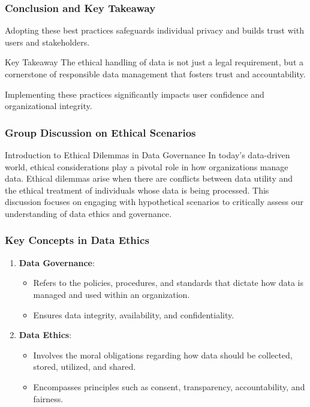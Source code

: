 \documentclass[aspectratio=169]{beamer}
\begin{document}
\begin{frame}[fragile]
    \frametitle{Conclusion and Key Takeaway}
    Adopting these best practices safeguards individual privacy and builds trust with users and stakeholders. 
    \begin{block}{Key Takeaway}
        The ethical handling of data is not just a legal requirement, but a cornerstone of responsible data management that fosters trust and accountability.
    \end{block}
    Implementing these practices significantly impacts user confidence and organizational integrity.
\end{frame}

\begin{frame}[fragile]
    \frametitle{Group Discussion on Ethical Scenarios}
    
    \begin{block}{Introduction to Ethical Dilemmas in Data Governance}
        In today's data-driven world, ethical considerations play a pivotal role in how organizations manage data. Ethical dilemmas arise when there are conflicts between data utility and the ethical treatment of individuals whose data is being processed. This discussion focuses on engaging with hypothetical scenarios to critically assess our understanding of data ethics and governance.
    \end{block}
\end{frame}

\begin{frame}[fragile]
    \frametitle{Key Concepts in Data Ethics}

    \begin{enumerate}
        \item \textbf{Data Governance}:
        \begin{itemize}
            \item Refers to the policies, procedures, and standards that dictate how data is managed and used within an organization.
            \item Ensures data integrity, availability, and confidentiality.
        \end{itemize}

        \item \textbf{Data Ethics}:
        \begin{itemize}
            \item Involves the moral obligations regarding how data should be collected, stored, utilized, and shared.
            \item Encompasses principles such as consent, transparency, accountability, and fairness.
        \end{itemize}
    \end{enumerate}
\end{frame}
\end{document}
